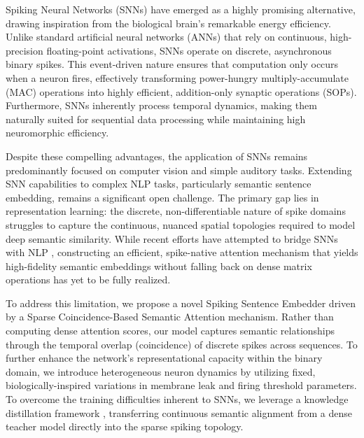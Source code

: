 \documentclass{article} %
\begin{document}
Spiking Neural Networks (SNNs) have emerged as a highly promising alternative, drawing inspiration from the biological brain's remarkable energy efficiency. Unlike standard artificial neural networks (ANNs) that rely on continuous, high-precision floating-point activations, SNNs operate on discrete, asynchronous binary spikes. This event-driven nature ensures that computation only occurs when a neuron fires, effectively transforming power-hungry multiply-accumulate (MAC) operations into highly efficient, addition-only synaptic operations (SOPs). Furthermore, SNNs inherently process temporal dynamics, making them naturally suited for sequential data processing while maintaining high neuromorphic efficiency.

Despite these compelling advantages, the application of SNNs remains predominantly focused on computer vision and simple auditory tasks. Extending SNN capabilities to complex NLP tasks, particularly semantic sentence embedding, remains a significant open challenge. The primary gap lies in representation learning: the discrete, non-differentiable nature of spike domains struggles to capture the continuous, nuanced spatial topologies required to model deep semantic similarity. While recent efforts have attempted to bridge SNNs with NLP \citep{li2022spikeformer, zhu2023spikegpt}, constructing an efficient, spike-native attention mechanism that yields high-fidelity semantic embeddings without falling back on dense matrix operations has yet to be fully realized.

To address this limitation, we propose a novel Spiking Sentence Embedder driven by a Sparse Coincidence-Based Semantic Attention mechanism. Rather than computing dense attention scores, our model captures semantic relationships through the temporal overlap (coincidence) of discrete spikes across sequences. To further enhance the network's representational capacity within the binary domain, we introduce heterogeneous neuron dynamics by utilizing fixed, biologically-inspired variations in membrane leak and firing threshold parameters. To overcome the training difficulties inherent to SNNs, we leverage a knowledge distillation framework \citep{hinton2015distilling}, transferring continuous semantic alignment from a dense teacher model directly into the sparse spiking topology.
\end{document}
